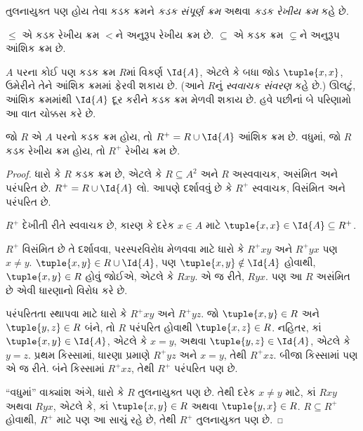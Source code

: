 \begin{defn}[કડક રેખીય ક્રમ]
તુલનાયુક્ત પણ હોય તેવા કડક ક્રમને \emph{કડક સંપૂર્ણ ક્રમ}
અથવા \emph{કડક રેખીય ક્રમ} કહે છે.
\end{defn}

\begin{ex}
$\le$ એ કડક રેખીય ક્રમ $<$ને અનુરૂપ રેખીય ક્રમ છે.
$\subseteq$ એ કડક ક્રમ $\subsetneq$ને અનુરૂપ આંશિક ક્રમ છે.
\end{ex}

$A$ પરના કોઈ પણ કડક ક્રમ $R$માં વિકર્ણ $\Id{A}$,
એટલે કે બધા જોડ $\tuple{x, x}$, ઉમેરીને તેને આંશિક ક્રમમાં
ફેરવી શકાય છે. (આને $R$નું \emph{સ્વવાચક સંવરણ} કહે છે.)
ઊલટું, આંશિક ક્રમમાંથી $\Id{A}$ દૂર કરીને કડક ક્રમ મેળવી શકાય છે.
હવે પછીનાં બે પરિણામો આ વાત ચોક્કસ કરે છે.

\begin{prop}
જો $R$ એ $A$ પરનો કડક ક્રમ હોય, તો $R^+ = R \cup \Id{A}$
આંશિક ક્રમ છે. વધુમાં, જો $R$ કડક રેખીય ક્રમ હોય, તો
$R^+$ રેખીય ક્રમ છે.
\end{prop}

\begin{proof}
ધારો કે $R$ કડક ક્રમ છે, એટલે કે $R \subseteq A^2$ અને
$R$ અસ્વવાચક, અસંમિત અને પરંપરિત છે.
$R^+ = R \cup \Id{A}$ લો. આપણે દર્શાવવું છે કે
$R^+$ સ્વવાચક, વિસંમિત અને પરંપરિત છે.

$R^+$ દેખીતી રીતે સ્વવાચક છે, કારણ કે દરેક $x \in A$
માટે $\tuple{x, x} \in \Id{A} \subseteq R^+$.

$R^+$ વિસંમિત છે તે દર્શાવવા, પરસ્પરવિરોધ મેળવવા માટે ધારો કે
$R^+xy$ અને $R^+yx$ પણ $x \neq y$.
$\tuple{x,y} \in R \cup \Id{A}$, પણ
$\tuple{x, y} \notin \Id{A}$ હોવાથી,
$\tuple{x, y} \in R$ હોવું જોઈએ, એટલે કે $Rxy$.
એ જ રીતે, $Ryx$. પણ આ $R$ અસંમિત છે એવી ધારણાનો વિરોધ કરે છે.

પરંપરિતતા સ્થાપવા માટે ધારો કે $R^+xy$ અને $R^+yz$.
જો $\tuple{x, y} \in R$ અને $\tuple{y,z} \in R$ બંને,
તો $R$ પરંપરિત હોવાથી $\tuple{x, z} \in R$.
નહિતર, કાં $\tuple{x, y} \in \Id{A}$, એટલે કે $x = y$,
અથવા $\tuple{y, z} \in \Id{A}$, એટલે કે $y = z$.
પ્રથમ કિસ્સામાં, ધારણા પ્રમાણે $R^+yz$ અને $x = y$,
તેથી $R^+xz$. બીજા કિસ્સામાં પણ એ જ રીતે.
બંને કિસ્સામાં $R^+xz$, તેથી $R^+$ પરંપરિત પણ છે.

“વધુમાં” વાક્યાંશ અંગે, ધારો કે $R$ તુલનાયુક્ત પણ છે.
તેથી દરેક $x \neq y$ માટે, કાં $Rxy$ અથવા $Ryx$,
એટલે કે, કાં $\tuple{x, y} \in R$ અથવા $\tuple{y, x} \in R$.
$R \subseteq R^+$ હોવાથી, $R^+$ માટે પણ આ સાચું રહે છે,
તેથી $R^+$ તુલનાયુક્ત પણ છે.
\end{proof}

